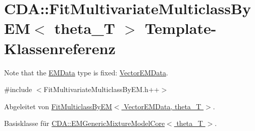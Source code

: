 \hypertarget{classCDA_1_1FitMultivariateMulticlassByEM}{
\section{CDA::FitMultivariateMulticlassByEM$<$ theta\_\-T $>$ Template-\/Klassenreferenz}
\label{classCDA_1_1FitMultivariateMulticlassByEM}
}


Note that the \hyperlink{classCDA_1_1EMData}{EMData} type is fixed: \hyperlink{classCDA_1_1VectorEMData}{VectorEMData}.  




{\ttfamily \#include $<$FitMultivariateMulticlassByEM.h++$>$}



Abgeleitet von \hyperlink{classCDA_1_1FitMulticlassByEM}{FitMulticlassByEM$<$ VectorEMData, theta\_\-T $>$}.



Basisklasse für \hyperlink{classCDA_1_1EMGenericMixtureModelCore}{CDA::EMGenericMixtureModelCore$<$ theta\_\-T $>$}.



